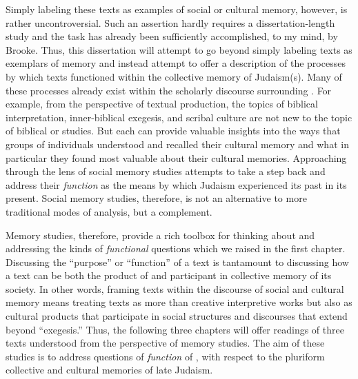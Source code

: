 Simply labeling these \rwb texts as examples of social or cultural memory, however, is rather uncontroversial. Such an assertion hardly requires a dissertation-length study and the task has already been sufficiently accomplished, to my mind, by Brooke.%
    \autocite{brooke_zsengeller2014}
Thus, this dissertation will attempt to go beyond simply labeling \rwb texts as exemplars of memory and instead attempt to offer a description of the processes by which \rwb texts functioned within the collective memory of \secondtemple Judaism(s). Many of these processes already exist within the scholarly discourse surrounding \rwb. For example, from the perspective of textual production, the topics of biblical interpretation, inner-biblical exegesis, and scribal culture are not new to the topic of biblical or \qumran studies. But each can provide valuable insights into the ways that groups of individuals understood and recalled their cultural memory and what in particular they found most valuable about their cultural memories. Approaching \rwb through the lens of social memory studies attempts to take a step back and address their \emph{function} as the means by which \secondtemple Judaism experienced its past in its present. Social memory studies, therefore, is not an alternative to more traditional modes of analysis, but a complement. 

Memory studies, therefore, provide a rich toolbox for thinking about and addressing the kinds of \emph{functional} questions which we raised in the first chapter. Discussing the ``purpose'' or ``function'' of a text is tantamount to discussing how a text can be both the product of and participant in collective memory of its society. In other words, framing \rwb texts within the discourse of social and cultural memory means treating \rwb texts as more than creative interpretive works but also as cultural products that participate in social structures and discourses that extend beyond ``exegesis.'' Thus, the following three chapters will offer readings of three \rwb texts understood from the perspective of memory studies. The aim of these studies is to address questions of \emph{function} of \rwb, with respect to the pluriform collective and cultural memories of late \secondtemple Judaism.